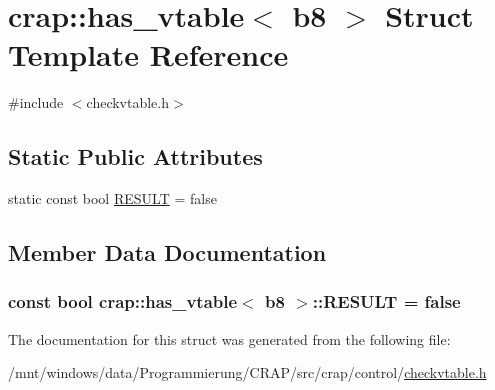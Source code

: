 \hypertarget{structcrap_1_1has__vtable_3_01b8_01_4}{\section{crap\-:\-:has\-\_\-vtable$<$ b8 $>$ Struct Template Reference}
\label{structcrap_1_1has__vtable_3_01b8_01_4}
}


{\ttfamily \#include $<$checkvtable.\-h$>$}

\subsection*{Static Public Attributes}
\begin{DoxyCompactItemize}
\item 
static const bool \hyperlink{structcrap_1_1has__vtable_3_01b8_01_4_aa41a048f75d27699858a6168ae3697d7}{R\-E\-S\-U\-L\-T} = false
\end{DoxyCompactItemize}


\subsection{Member Data Documentation}
\hypertarget{structcrap_1_1has__vtable_3_01b8_01_4_aa41a048f75d27699858a6168ae3697d7}{
\subsubsection[{R\-E\-S\-U\-L\-T}]{\setlength{\rightskip}{0pt plus 5cm}const bool {\bf crap\-::has\-\_\-vtable}$<$ {\bf b8} $>$\-::R\-E\-S\-U\-L\-T = false\hspace{0.3cm}{\ttfamily [static]}}}\label{structcrap_1_1has__vtable_3_01b8_01_4_aa41a048f75d27699858a6168ae3697d7}


The documentation for this struct was generated from the following file\-:\begin{DoxyCompactItemize}
\item 
/mnt/windows/data/\-Programmierung/\-C\-R\-A\-P/src/crap/control/\hyperlink{checkvtable_8h}{checkvtable.\-h}\end{DoxyCompactItemize}

